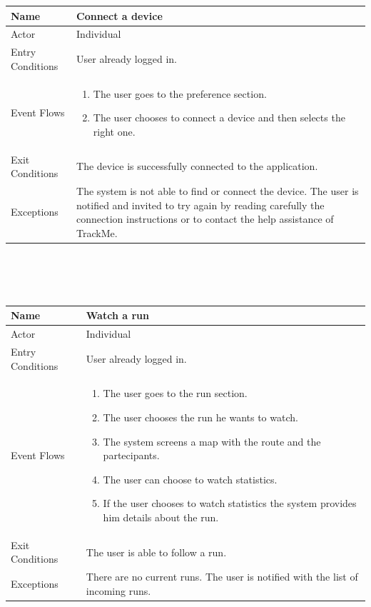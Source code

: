\documentclass{article}
\begin{document}
\begin{legal}
\begin{legal}
\begin{legal}
				\begin{tabular}{| m{3.5cm} | m{8cm}| }
				\hline
					Name & Connect a device\\
				\hline
					Actor & Individual\\
				\hline
					Entry Conditions & User already logged in.\\
				\hline
					Event Flows & \begin{enumerate}
									\item The user goes to the preference section.
									\item The user chooses to connect a device and then selects the right one.
				\end{enumerate}\\
				\hline
					Exit Conditions & The device is successfully connected to the application.\\
				\hline
					Exceptions & The system is not able to find or connect the device. The user is notified and invited to try again by reading carefully the connection instructions or to contact the help assistance of TrackMe.\\
				\hline
				\end{tabular}
				\\\\\\
				\begin{tabular}{| m{3.5cm} | m{8cm}| }
				\hline
					Name & Watch a run\\
				\hline
					Actor & Individual\\
				\hline
					Entry Conditions & User already logged in.\\
				\hline
					Event Flows & \begin{enumerate}
									\item The user goes to the run section.
									\item The user chooses the run he wants to watch.
									\item The system screens a map with the route and the partecipants.
									\item The user can choose to watch statistics.
									\item If the user chooses to watch statistics the system provides him details about the run.
				\end{enumerate}\\
				\hline
					Exit Conditions & The user is able to follow a run.\\
				\hline
					Exceptions & There are no current runs. The user is notified with the list of incoming runs.\\

\end{tabular}
\end{legal}
\end{legal}
\end{legal}
\end{document}
